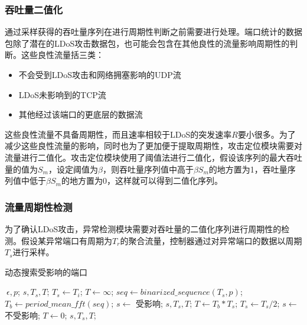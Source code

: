 \subsubsection{吞吐量二值化}
\label{chap4:binarization}
通过采样获得的吞吐量序列在进行周期性判断之前需要进行处理。端口统计的数据包除了潜在的LDoS攻击数据包，也可能会包含在其他良性的流量影响周期性的判断。这些良性流量括三类：
\begin{itemize}
	\item 不会受到LDoS攻击和网络拥塞影响的UDP流
	\item LDoS未影响到的TCP流
	\item 其他经过该端口的更底层的数据流
\end{itemize}
这些良性流量不具备周期性，而且速率相较于LDoS的突发速率$R$要小很多。为了减少这些良性流量的影响，同时也为了更加便于提取周期性，攻击定位模块需要对流量进行二值化。攻击定位模块使用了阈值法进行二值化，假设该序列的最大吞吐量的值为$S_m$，设定阈值为$\beta$，则吞吐量序列值中高于$\beta S_m$的地方置为1，吞吐量序列值中低于$\beta S_m$的地方置为0，这样就可以得到二值化序列。

\subsubsection{流量周期性检测}
为了确认LDoS攻击，异常检测模块需要对吞吐量的二值化序列进行周期性的检测。假设某异常端口有周期为$T_r$的聚合流量，控制器通过对异常端口的数据以周期$T_s$进行采样。


\begin{algorithm}[H]
	\caption{动态搜索受影响的端口}
	\label{alg:port_locate}
	\begin{algorithmic}[1]
		\Require $~{\epsilon}, p$;
		\Ensure $s, T_s, T$;
		\State $T_s \gets T_i$;
		\State $T \gets \infty$; 
		\State $seq \gets binarized\_sequence(T_s, p)$;
		\State $T_b \gets period\_mean\_fft(seq)$;
		\State $s \gets$ 受影响;
		\State \Return $s, T_s, T$;
		\Else
		\State $T \gets T_b * T_s$;
		\State $T_s \gets T_s / 2$;
		\EndIf 
		\EndWhile
		\State $s \gets$ 不受影响;
		\State $T \gets 0$; 
		\State \Return $s, T_s, T$;
	\end{algorithmic}
\end{algorithm}